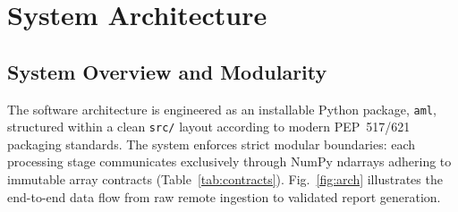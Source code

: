 \documentclass[conference]{IEEEtran}
\newcommand{\code}[1]{\texttt{#1}}
\newcommand{\file}[1]{\texttt{#1}}
\begin{document}
\section{System Architecture}
\label{sec:arch}

\subsection{System Overview and Modularity}
The software architecture is engineered as an installable Python package,
\code{aml}, structured within a clean \file{src/} layout according to
modern PEP~517/621 packaging standards. The system enforces strict modular
boundaries: each processing stage communicates exclusively through NumPy
ndarrays adhering to immutable array contracts (Table~\ref{tab:contracts}).
Fig.~\ref{fig:arch} illustrates the end-to-end data flow from raw remote
ingestion to validated report generation.
\end{document}
